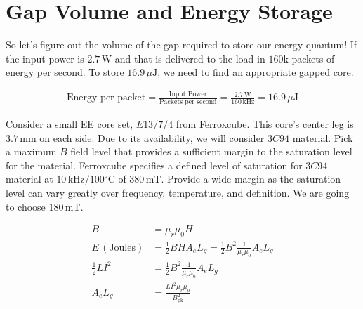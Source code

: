 \documentclass{article}
\begin{document}
\section{Gap Volume and Energy Storage}
So let's figure out the volume of the gap required to store our energy quantum!
If the input power is \(2.7 \, \text{W}\) and that is delivered to the load in \(160\text{k}\) packets of energy per second. To store \(16.9 \, \mu\text{J}\), we need to find an appropriate gapped core.

\begin{align}
\text{Energy per packet} = \frac{\text{Input Power}}{\text{Packets per second}} = \frac{2.7 \, \text{W}}{160 \, \text{kHz}} = 16.9 \, \mu\text{J}
\end{align}

Consider a small EE core set, \(E13/7/4\) from Ferroxcube. This core’s center leg is \(3.7 \, \text{mm}\) on each side. Due to its availability, we will consider \(3C94\) material. Pick a maximum \(B\) field level that provides a sufficient margin to the saturation level for the material. Ferroxcube specifies a defined level of saturation for \(3C94\) material at \(10 \, \text{kHz}/100^\circ \text{C}\) of \(380 \, \text{mT}\). Provide a wide margin as the saturation level can vary greatly over frequency, temperature, and definition. We are going to choose \(180 \, \text{mT}\).

\begin{align}
B &= \mu_r \mu_0 H \\
E \, (\text{Joules}) &= \frac{1}{2} B H A_e L_g = \frac{1}{2} B^2 \frac{1}{\mu_r \mu_0} A_e L_g \\
\frac{1}{2} L I^2 &= \frac{1}{2} B^2 \frac{1}{\mu_r \mu_0} A_e L_g \\
A_e L_g &= \frac{L I^2 \mu_r \mu_0}{B_\text{pk}^2}
\end{align}
\end{document}
